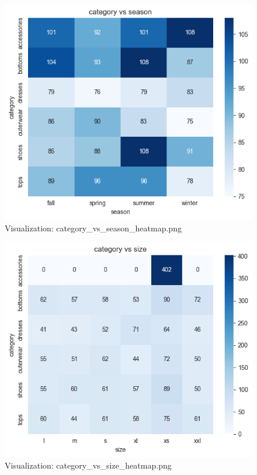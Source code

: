 \documentclass{article}%
\begin{document}
\vspace{10pt}%
\\%
\begin{minipage}[c]{0.48\textwidth}%


\begin{figure}[H]%
\centering%
\includegraphics[width=\linewidth]{output/plots/category_vs_season_heatmap.png}%
\caption{Visualization: category\_vs\_season\_heatmap.png}%
\end{figure}

%
\end{minipage}%
\begin{minipage}[c]{0.48\textwidth}%


\begin{figure}[H]%
\centering%
\includegraphics[width=\linewidth]{output/plots/category_vs_size_heatmap.png}%
\caption{Visualization: category\_vs\_size\_heatmap.png}%
\end{figure}

%
\end{minipage}%
\end{document}
